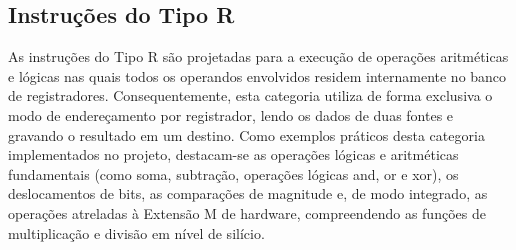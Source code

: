 \documentclass[
	12pt,				%
	oneside,
	a4paper,			%
	english,			%
	french,				%
	spanish,			%
	brazil,				%
	]{abntex2}
\begin{document}
\subsection{Instruções do Tipo R}
As instruções do Tipo R são projetadas para a execução de operações aritméticas e lógicas nas quais todos os operandos envolvidos residem internamente no banco de registradores. Consequentemente, esta categoria utiliza de forma exclusiva o modo de endereçamento por registrador, lendo os dados de duas fontes e gravando o resultado em um destino. Como exemplos práticos desta categoria implementados no projeto, destacam-se as operações lógicas e aritméticas fundamentais (como soma, subtração, operações lógicas and, or e xor), os deslocamentos de bits, as comparações de magnitude e, de modo integrado, as operações atreladas à Extensão M de hardware, compreendendo as funções de multiplicação e divisão em nível de silício.
\end{document}
